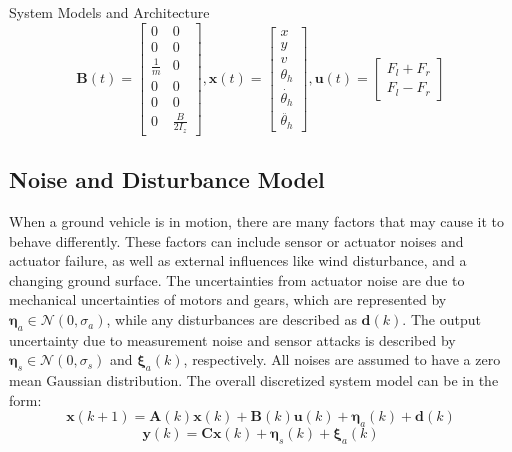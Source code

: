 \begin{section}{System Models and Architecture}
\begin{equation}
	\bm{B}(t)=\begin{bmatrix} 0 & 0 \\ 0 & 0 \\ \frac{1}{m} & 0 \\ 0 & 0  \\ 0 & 0 \\  0 & \frac{B}{2I_z} \end{bmatrix}, \bm{x}(t)=\begin{bmatrix} x \\ y \\ v \\ \theta_h \\ \dot{\theta_h} \\ \ddot{\theta_h} \end{bmatrix}, \bm{u}(t)=\begin{bmatrix} F_l+F_r \\ F_l-F_r \end{bmatrix} \nonumber
	\end{equation}
	
 \subsection{Noise and Disturbance Model}
When a ground vehicle is in motion, there are many factors that may cause it to behave differently. These factors can include sensor or actuator noises and actuator failure, as well as external influences like wind disturbance, and a changing ground surface. The uncertainties from actuator noise are due to mechanical uncertainties of motors and gears, which are represented by $ \bm{\eta}_a \in \mathcal{N}(0,\sigma_a) $, while any disturbances are described as $\bm{d}(k)$. The output uncertainty due to measurement noise and sensor attacks is described by $ \bm{\eta}_s \in \mathcal{N}(0,\sigma_s) $ and $\bm{\xi}_a(k)$, respectively. All noises are assumed to have a zero mean Gaussian distribution. The overall discretized system model can be in the form:
    \begin{equation}
	\bm{x}(k+1)=\bm{A}(k)\bm{x}(k)+\bm{B}(k)\bm{u}(k)+\bm{\eta}_a(k)+\bm{d}(k)
	\end{equation}
	\begin{equation}
	\bm{y}(k)=\bm{C}\bm{x}(k)+\bm{\eta}_s(k)+\bm{\xi}_a(k)
	\end{equation}


\end{section}

